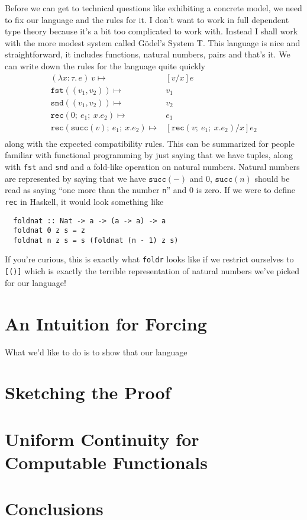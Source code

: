 \documentclass[12pt]{amsart}
\newcommand{\lam}[3]{\lambda #1 : #2.\, #3}
\newcommand{\ap}[2]{#1\ #2}
\newcommand{\prl}[1]{\mathtt{fst}(#1)}
\newcommand{\prr}[1]{\mathtt{snd}(#1)}
\newcommand{\natrec}[3]{\mathtt{rec}(#1;\ #2;\ #3)}
\renewcommand{\succ}[1]{\mathtt{succ}(#1)}
\begin{document}
Before we can get to technical questions like exhibiting a concrete
model, we need to fix our language and the rules for it. I don't want
to work in full dependent type theory because it's a bit too
complicated to work with. Instead I shall work with the more modest
system called G\"odel's System T. This language is nice and
straightforward, it includes functions, natural numbers, pairs and that's
it. We can write down the rules for the language quite quickly
\begin{align*}
  \ap{(\lam{x}{\tau}{e})}{v} \mapsto& [v/x]e\\
  \prl{(v_1, v_2)} \mapsto& v_1\\
  \prr{(v_1, v_2)} \mapsto& v_2\\
  \natrec{0}{e_1}{x.e_2} \mapsto& e_1\\
  \natrec{\succ{v}}{e_1}{x.e_2} \mapsto& [\natrec{v}{e_1}{x.e_2}/x]e_2\\
\end{align*}
along with the expected compatibility rules. This can be summarized
for people familiar with functional programming by just saying that we
have tuples, along with {\tt fst} and {\tt snd} and a fold-like
operation on natural numbers. Natural numbers are represented by
saying that we have $\succ{-}$ and $0$, $\succ{n}$ should be read as saying
``one more than the number {\tt n}'' and 0 is zero. If we were to
define {\tt rec} in Haskell, it would look something like
\begin{verbatim}
  foldnat :: Nat -> a -> (a -> a) -> a
  foldnat 0 z s = z
  foldnat n z s = s (foldnat (n - 1) z s)
\end{verbatim}
If you're curious, this is exactly what {\tt foldr} looks like if we
restrict ourselves to {\tt [()]} which is exactly the terrible
representation of natural numbers we've picked for our language!
\section{An Intuition for Forcing}

What we'd like to do is to show that our language

\section{Sketching the Proof}
\section{Uniform Continuity for Computable Functionals}
\section{Conclusions}
\end{document}
